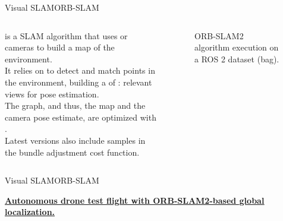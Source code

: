 \begin{frame}{Visual SLAM}{ORB-SLAM}
  \begin{columns}
     is a  SLAM algorithm that uses  or  cameras to build a map of the environment.\\
    \medskip
    It relies on  to detect and match points in the environment, building a  of : relevant views for pose estimation.\\
    \medskip
    The graph, and thus, the map and the camera pose estimate, are optimized with .\\
    \medskip
    Latest versions also include  samples in the bundle adjustment cost function.

		\begin{figure}
			\centering
			\caption{ORB-SLAM2 algorithm execution on a ROS 2 dataset (bag).}
			\label{vid:building}
		\end{figure}
  \end{columns}
\end{frame}
\begin{frame}{Visual SLAM}{ORB-SLAM}
  \begin{block}{}
    \centering
    \href{https://www.youtube.com/watch?v=S2c7s_EFVBM}{\color{blue}\underline{\textbf{Autonomous drone test flight with ORB-SLAM2-based global localization.}}}
  \end{block}
\end{frame}
